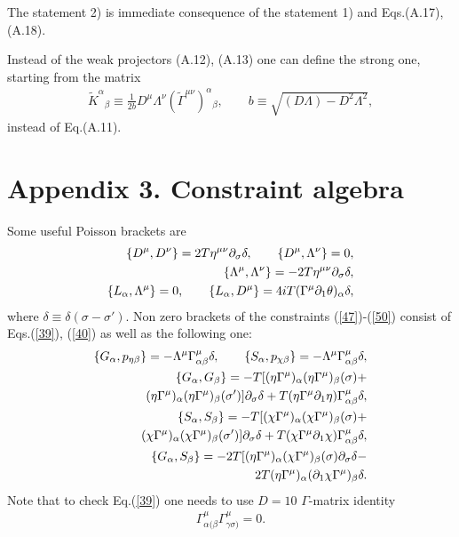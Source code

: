 \documentclass[a4paper]{article}
\begin{document}
The statement 2) is immediate consequence of the statement 1) 
and Eqs.(A.17), (A.18).

Instead of the weak projectors (A.12), (A.13) one can  
define the strong one, starting from the matrix 
\begin{eqnarray}
\tilde K^\alpha{}_\beta\equiv\frac{1}{2b}D^\mu\Lambda^\nu
(\tilde\Gamma^{\mu\nu})^\alpha{}_\beta, \qquad 
b\equiv\sqrt{(D\Lambda)-D^2\Lambda^2},
\end{eqnarray}
instead of Eq.(A.11).

\section*{Appendix 3. Constraint algebra}
\setcounter{equation}{22}
\def\theequation{A.\arabic{equation}}
Some useful Poisson brackets are 
\begin{eqnarray}
\{D^\mu, D^\nu\}=2T\eta^{\mu\nu}\partial_\sigma\delta, \qquad 
\{D^\mu, \Lambda^\nu\}=0, \cr 
\{\Lambda^\mu, \Lambda^\nu\}=-2T\eta^{\mu\nu}\partial_\sigma\delta, \cr 
\{L_\alpha, \Lambda^\mu\}=0, \qquad
\{L_\alpha, D^\mu\}=4iT(\Gamma^\mu\partial_1\theta)_\alpha\delta,
\end{eqnarray}
where $\delta\equiv\delta(\sigma-\sigma ')$. Non zero brackets of the 
constraints (\ref{47})-(\ref{50}) consist of Eqs.(\ref{39}), (\ref{40}) 
as well as the following one: 
\begin{eqnarray}
\{G_\alpha, p_{\eta\beta}\}=-\Lambda^\mu\Gamma^\mu_{\alpha\beta}\delta, 
\qquad \{S_\alpha, p_{\chi\beta}\}=
-\Lambda^\mu\Gamma^\mu_{\alpha\beta}\delta, \cr 
\{G_\alpha, G_\beta\}=
-T[(\eta\Gamma^\mu)_\alpha(\eta\Gamma^\mu)_\beta(\sigma)+ \cr
(\eta\Gamma^\mu)_\alpha(\eta\Gamma^\mu)_\beta(\sigma ')]
\partial_\sigma\delta+
T(\eta\Gamma^\mu\partial_1\eta)\Gamma^\mu_{\alpha\beta}\delta, \cr
\{S_\alpha, S_\beta\}=
-T[(\chi\Gamma^\mu)_\alpha(\chi\Gamma^\mu)_\beta(\sigma)+ \cr
(\chi\Gamma^\mu)_\alpha(\chi\Gamma^\mu)_\beta(\sigma ')]
\partial_\sigma\delta+
T(\chi\Gamma^\mu\partial_1\chi)\Gamma^\mu_{\alpha\beta}\delta, \cr
\{G_\alpha, S_\beta\}=
-2T[(\eta\Gamma^\mu)_\alpha(\chi\Gamma^\mu)_\beta(\sigma)
\partial_\sigma\delta- \cr
2T(\eta\Gamma^\mu)_\alpha(\partial_1\chi\Gamma^\mu)_\beta\delta.
\end{eqnarray}
Note that to check Eq.(\ref{39}) one needs to use $D=10$ $\Gamma$-matrix 
identity 
\begin{eqnarray}
\Gamma^\mu_{\alpha(\beta}\Gamma^\mu_{\gamma\sigma)}=0.
\end{eqnarray}
  
\end{document}

